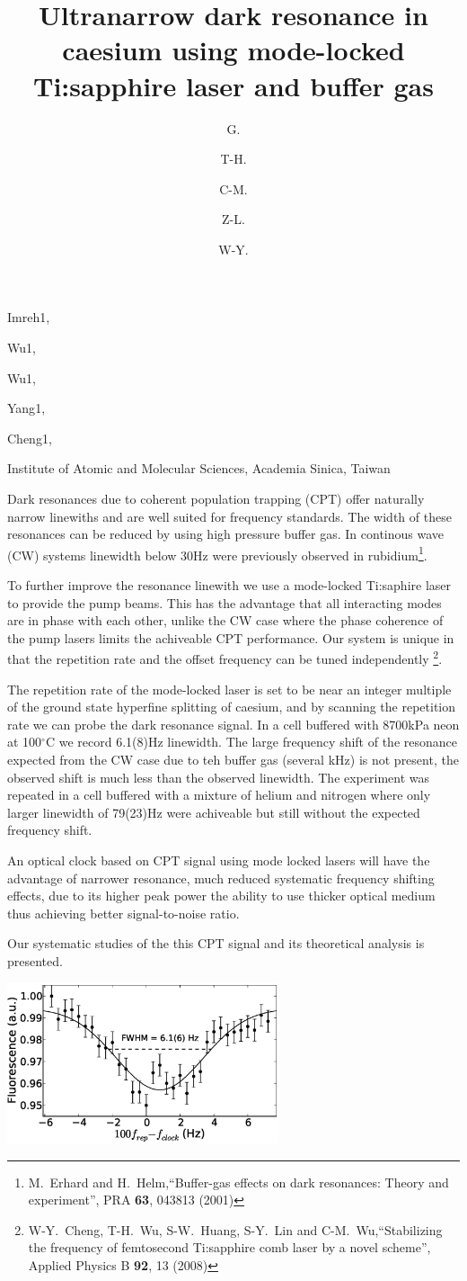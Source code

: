 \documentclass[10pt]{article}
\begin{document}

\title{Ultranarrow dark resonance in caesium using mode-locked Ti:sapphire laser and buffer gas}

\begin{authors}
  \author{G.}{Imreh}{1},
  \author{T-H.}{Wu}{1},
  \author{C-M.}{Wu}{1},
  \author{Z-L.}{Yang}{1},
  \author{W-Y.}{Cheng}{1},
\end{authors}

\address{1}{Institute of Atomic and Molecular Sciences, Academia Sinica, Taiwan}

\begintext

Dark resonances due to coherent population trapping (CPT) offer naturally narrow linewiths and
are well suited for frequency standards. The width of these resonances can be reduced
by using high pressure buffer gas. In continous wave (CW) systems linewidth below 30Hz were
previously observed in rubidium\footnote{M.~Erhard and H.~Helm,``Buffer-gas effects on dark resonances: Theory and experiment'',
PRA {\bf 63}, 043813 (2001)}.

To further improve the resonance linewith we use a mode-locked Ti:saphire laser to provide the pump beams. This has the advantage that all interacting modes are in phase with each other, unlike the CW case where the phase coherence of the pump lasers limits the achiveable CPT performance. Our system is unique in that the repetition rate and the offset frequency can be tuned independently \footnote{W-Y.~Cheng, T-H.~Wu, S-W.~Huang, S-Y.~Lin and C-M.~Wu,``Stabilizing the frequency of femtosecond Ti:sapphire comb laser by a novel scheme'', Applied Physics B {\bf 92}, 13 (2008)}. 

The repetition rate of the mode-locked laser is set to be near an integer multiple of the ground state hyperfine splitting of caesium, and by scanning the repetition rate we can probe the dark resonance signal. In a cell buffered with 8700kPa neon at 100$^\circ$C we record 6.1(8)Hz linewidth. The large frequency shift of the resonance expected from the CW case due to teh buffer gas (several kHz) is not present, the observed shift is much less than the observed linewidth. The experiment was repeated in a cell buffered with a mixture of helium and nitrogen where only larger linewidth of 79(23)Hz were achiveable but still without the expected frequency shift. 

An optical clock based on CPT signal using mode locked lasers will have the advantage of narrower resonance, much reduced systematic frequency shifting effects, due to its higher peak power the ability to use thicker optical medium thus achieving better signal-to-noise ratio.

Our systematic studies of the this CPT signal and its theoretical analysis is presented.

\begin{center}
  \includegraphics[width=0.6\textwidth]{8700Ne_buffer.eps}
\end{center}

\end{document}
